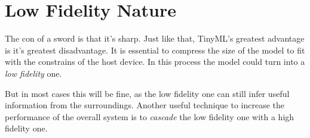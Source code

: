 \documentclass[../../main]{subfiles}
\begin{document}
\section{Low Fidelity Nature} \label{sec:}

The con of a sword is that it's sharp. Just like that, TinyML's
greatest advantage is it's greatest disadvantage. It is essential
to compress the size of the model to fit with the constrains of the
host device. In this process the model could turn into a \emph{low fidelity}
one.

But in most cases this will be fine, as the low fidelity one can
still infer useful information from the surroundings. Another useful
technique to increase the performance of the overall system is to
\emph{cascade} the low fidelity one with a high fidelity one.


\end{document}
